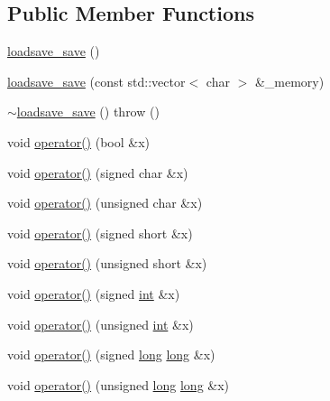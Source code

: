 \subsection*{Public Member Functions}
\begin{DoxyCompactItemize}
\item 
\hyperlink{classgambatte_1_1loadsave__save_a20d59d77be9783899fa6bfaa05ba538d}{loadsave\+\_\+save} ()
\item 
\hyperlink{classgambatte_1_1loadsave__save_a77f4a895a2cee689040d2be79d918326}{loadsave\+\_\+save} (const std\+::vector$<$ char $>$ \&\+\_\+memory)
\item 
\hyperlink{classgambatte_1_1loadsave__save_a2cbd85f09fe71b5ea11eead5da1c553e}{$\sim$loadsave\+\_\+save} ()  throw ()
\item 
void \hyperlink{classgambatte_1_1loadsave__save_a05b06e5e375fede9a5821fc2bbfd1cd9}{operator()} (bool \&x)
\item 
void \hyperlink{classgambatte_1_1loadsave__save_a9e8ce089bd78f68b0319105a9a630e38}{operator()} (signed char \&x)
\item 
void \hyperlink{classgambatte_1_1loadsave__save_a5738bf9ee07da4c9c6af989f22e5ba29}{operator()} (unsigned char \&x)
\item 
void \hyperlink{classgambatte_1_1loadsave__save_a609ecf15fc89c056274bffa5276e9067}{operator()} (signed short \&x)
\item 
void \hyperlink{classgambatte_1_1loadsave__save_a41020b59c5ede44126da64f65cf1a832}{operator()} (unsigned short \&x)
\item 
void \hyperlink{classgambatte_1_1loadsave__save_a2115dc711a381d2cab3f2477db3f6d19}{operator()} (signed \hyperlink{ioapi_8h_a787fa3cf048117ba7123753c1e74fcd6}{int} \&x)
\item 
void \hyperlink{classgambatte_1_1loadsave__save_a180b12dd078bb2d0539a78c9f232c15c}{operator()} (unsigned \hyperlink{ioapi_8h_a787fa3cf048117ba7123753c1e74fcd6}{int} \&x)
\item 
void \hyperlink{classgambatte_1_1loadsave__save_a632b38781a3ce7198eb4ec079c9d1d12}{operator()} (signed \hyperlink{ioapi_8h_a3c7b35ad9dab18b8310343c201f7b27e}{long} \hyperlink{ioapi_8h_a3c7b35ad9dab18b8310343c201f7b27e}{long} \&x)
\item 
void \hyperlink{classgambatte_1_1loadsave__save_a7249aea6e271152e391d8e7b0cc02533}{operator()} (unsigned \hyperlink{ioapi_8h_a3c7b35ad9dab18b8310343c201f7b27e}{long} \hyperlink{ioapi_8h_a3c7b35ad9dab18b8310343c201f7b27e}{long} \&x)
\item 

\end{DoxyCompactItemize}
